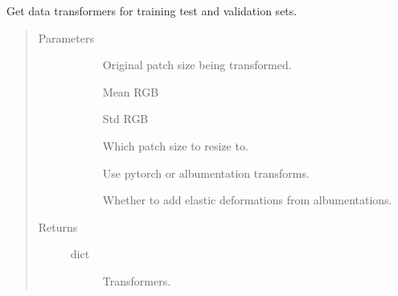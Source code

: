 \documentclass[letterpaper,10pt,english]{sphinxmanual}
\begin{document}

\begin{fulllineitems}
\label{\detokenize{index:pathflowai.datasets.get_data_transforms}}
Get data transformers for training test and validation sets.
\begin{quote}\begin{description}
\item[{Parameters}] \leavevmode\begin{description}
\item[{}] \leavevmode
Original patch size being transformed.

\item[{}] \leavevmode
Mean RGB

\item[{}] \leavevmode
Std RGB

\item[{}] \leavevmode
Which patch size to resize to.

\item[{}] \leavevmode
Use pytorch or albumentation transforms.

\item[{}] \leavevmode
Whether to add elastic deformations from albumentations.

\end{description}

\item[{Returns}] \leavevmode\begin{description}
\item[{dict}] \leavevmode
Transformers.

\end{description}

\end{description}\end{quote}

\end{fulllineitems}
\end{document}
